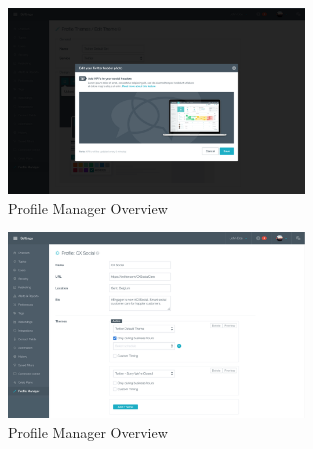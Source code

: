 \begin{figure}[H]
	\centering
	\includegraphics[width=0.7\textwidth]{Figuren/Mockups/EditDialog.png}
	\caption{Profile Manager Overview}
\end{figure} 

\begin{figure}[H]
	\centering
	\includegraphics[width=0.7\textwidth]{Figuren/Mockups/EditProfile.png}
	\caption{Profile Manager Overview}
\end{figure} 
\fi












